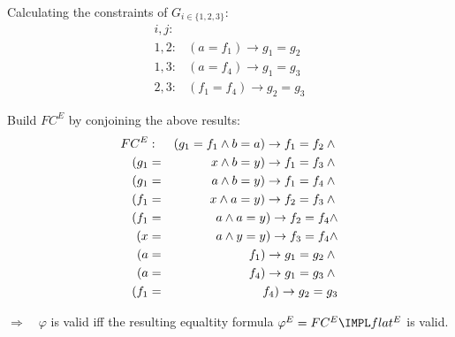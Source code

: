 {\begin{enumerate}
	Calculating the constraints of $G_{i\in \{1,2,3\}}$:%
	\begin{equation*}
	\begin{array}{ll}
	i,j: &  \\ 
	1,2: & (a=f_{1})\rightarrow g_{1}=g_{2} \\ 
	1,3: & (a=f_{4})\rightarrow g_{1}=g_{3} \\ 
	2,3: & (f_{1}=f_{4})\rightarrow g_{2}=g_{3}%
	\end{array}%
	\end{equation*}

	Build $FC^{E}$ by conjoining the above results:%
	\begin{eqnarray*}
	FC^{E} &:&(g_{1}=f_{1}\wedge b=a)\rightarrow f_{1}=f_{2}\wedge \newline
	\\
	(g_{1} &=&x\wedge b=y)\rightarrow f_{1}=f_{3}\wedge \newline
	\\
	(g_{1} &=&a\wedge b=y)\rightarrow f_{1}=f_{4}\wedge \newline
	\\
	(f_{1} &=&x\wedge a=y)\rightarrow f_{2}=f_{3}\wedge \newline
	\\
	(f_{1} &=&a\wedge a=y)\rightarrow f_{2}=f_{4}\wedge  \\
	(x &=&a\wedge y=y)\rightarrow f_{3}=f_{4}\newline
	\newline
	\wedge  \\
	(a &=&f_{1})\rightarrow g_{1}=g_{2}\wedge \newline
	\\
	(a &=&f_{4})\rightarrow g_{1}=g_{3}\wedge \newline
	\\
	(f_{1} &=&f_{4})\rightarrow g_{2}=g_{3}
	\end{eqnarray*}

	$\Rightarrow \quad \varphi $ is valid iff the resulting equaltity formula $%
	\varphi ^{E}=FC^{E}\IMPL flat^{E}$ is valid.
	
	\end{enumerate}
}